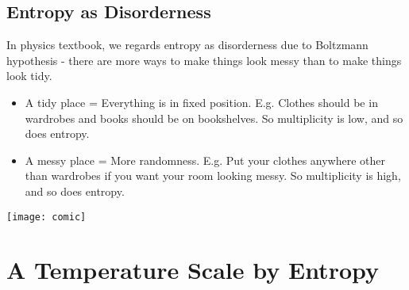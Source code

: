 \documentclass[class=article, crop=false, 12pt]{standalone}
\begin{document}
\subsection{Entropy as Disorderness}

In physics textbook, 
we regards entropy as disorderness due to Boltzmann hypothesis - 
there are more ways to make things look messy than to make things look tidy.
\begin{itemize}
    \item A tidy place = Everything is in fixed position. E.g. Clothes should be in wardrobes and books should be on bookshelves.
    So multiplicity is low, and so does entropy.

    \item A messy place = More randomness. E.g. Put your clothes anywhere other than wardrobes if you want your room looking messy.
    So multiplicity is high, and so does entropy.
\end{itemize}

\begin{center}
    \begin{minipage}{0.4\linewidth}
        \centering
        \texttt{[image: comic]}
    \end{minipage}
\end{center}


\linesep
\section{A Temperature Scale by Entropy}
\end{document}
